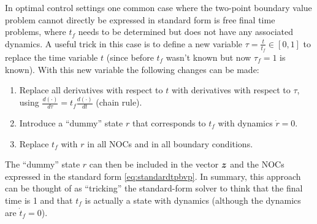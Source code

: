 In optimal control settings one common case where the two-point boundary value problem cannot directly be expressed in standard form is free final time problems, where $t_f$ needs to be determined but does not have any associated dynamics. A useful trick in this case is to define a new variable $\tau = \frac{t}{t_f} \in [0,1]$ to replace the time variable $t$ (since before $t_f$ wasn't known but now $\tau_f = 1$ is known). With this new variable the following changes can be made:
\begin{enumerate}
    \item Replace all derivatives with respect to $t$ with derivatives with respect to $\tau$, using $\frac{d(\cdot)}{d\tau} = t_f \frac{d(\cdot)}{dt}$ (chain rule).
    \item Introduce a ``dummy'' state $r$ that corresponds to $t_f$ with dynamics $\dot{r} = 0$.
    \item Replace $t_f$ with $r$ in all NOCs and in all boundary conditions.
\end{enumerate}
The ``dummy'' state $r$ can then be included in the vector $\bm{z}$ and the NOCs expressed in the standard form \eqref{eq:standardtpbvp}. In summary, this approach can be thought of as ``tricking'' the standard-form solver to think that the final time is 1 and that $t_f$ is actually a state with dynamics (although the dynamics are $\dot{t}_f = 0$).


